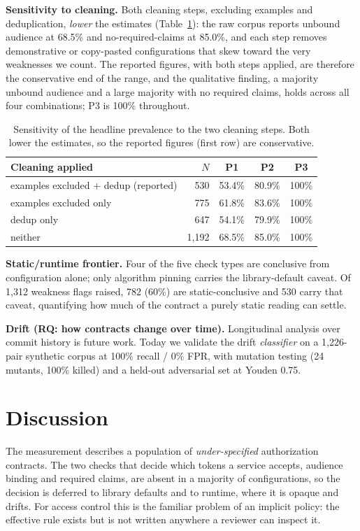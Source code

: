 \noindent\textbf{Sensitivity to cleaning.} Both cleaning steps, excluding examples
and deduplication, \emph{lower} the estimates (Table~\ref{tab:sensitivity}): the raw
corpus reports unbound audience at 68.5\% and no-required-claims at 85.0\%, and each
step removes demonstrative or copy-pasted configurations that skew toward the very
weaknesses we count. The reported figures, with both steps applied, are therefore
the conservative end of the range, and the qualitative finding, a majority unbound
audience and a large majority with no required claims, holds across all four
combinations; P3 is 100\% throughout.

\begin{table}[t]
\centering\small
\caption{Sensitivity of the headline prevalence to the two cleaning steps. Both
lower the estimates, so the reported figures (first row) are conservative.}
\label{tab:sensitivity}
\begin{tabular}{@{}lrccc@{}}
\toprule
Cleaning applied & $N$ & P1 & P2 & P3 \\
\midrule
examples excluded + dedup (reported) & 530 & 53.4\% & 80.9\% & 100\% \\
examples excluded only & 775 & 61.8\% & 83.6\% & 100\% \\
dedup only & 647 & 54.1\% & 79.9\% & 100\% \\
neither & 1{,}192 & 68.5\% & 85.0\% & 100\% \\
\bottomrule
\end{tabular}
\end{table}

\noindent\textbf{Static/runtime frontier.} Four of the five check types are
conclusive from configuration alone; only algorithm pinning carries the
library-default caveat. Of 1{,}312 weakness flags raised, 782 (60\%) are
static-conclusive and 530 carry that caveat, quantifying how much of the contract a
purely static reading can settle.



\noindent\textbf{Drift (RQ: how contracts change over time).}
Longitudinal analysis over commit history is future work. Today we validate the
drift \emph{classifier} on a 1{,}226-pair synthetic corpus at 100\% recall / 0\%
FPR, with mutation testing (24 mutants, 100\% killed) and a held-out adversarial
set at Youden 0.75. 

\section{Discussion}\label{sec:discussion}
The measurement describes a population of \emph{under-specified} authorization
contracts. The two checks that decide which tokens a service accepts, audience
binding and required claims, are absent in a majority of configurations, so the
decision is deferred to library defaults and to runtime, where it is opaque and
drifts. For access control this is the familiar problem of an implicit policy: the
effective rule exists but is not written anywhere a reviewer can inspect it.

